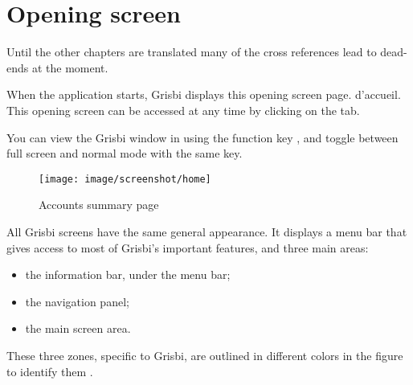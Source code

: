 
\chapter{Opening screen\label{home}}

 Until the other chapters are translated many of the cross references lead to dead-ends at the moment.


When the application starts, Grisbi displays this
\ifIllustration opening screen  page.
\else d'accueil.
\fi
This opening screen can be accessed at any time by clicking on the   tab. 

You can view the Grisbi window in  using the function key , and toggle between full screen and normal mode with the same key.

\ifIllustration
\begin{figure}[htbp]
\begin{center}
\texttt{[image: image/screenshot/home]}
\end{center}
\caption{Accounts summary page}
\label{home-img}
\end{figure}
\fi

All Grisbi screens have the same general appearance. It displays a menu bar that gives access to most of Grisbi's important features, and three main areas:

\begin{itemize}
	 \item the information bar, under the menu bar;
	 \item the navigation panel;
	 \item the main screen area.
\end{itemize}

\ifIllustration 
These three zones, specific to Grisbi, are outlined in different colors in the figure to identify them .
\else
\fi

